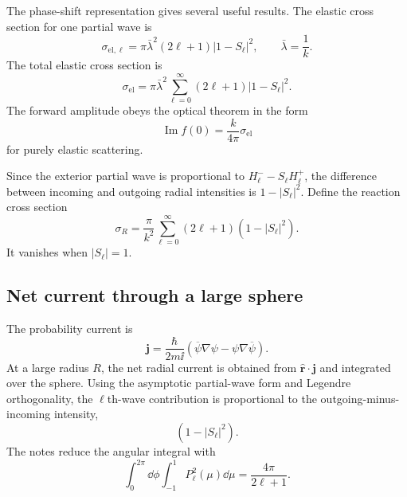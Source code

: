 The phase-shift representation gives several useful results.  The elastic cross section for one partial wave is
\begin{equation}
  \sigma_{\mathrm{el},\ell}
  =\pi\bar\lambda^2(2\ell+1)|1-S_\ell|^2,
  \qquad \bar\lambda=\frac{1}{k}.
  \label{eq:ns2-el-partial}
\end{equation}
The total elastic cross section is
\begin{equation}
  \sigma_{\mathrm{el}}
  =\pi\bar\lambda^2
  \sum_{\ell=0}^{\infty}(2\ell+1)|1-S_\ell|^2.
  \label{eq:ns2-el-total}
\end{equation}
The forward amplitude obeys the optical theorem in the form
\begin{equation}
  \operatorname{Im}f(0)=\frac{k}{4\pi}\sigma_{\mathrm{el}}
  \label{eq:ns2-optical-elastic}
\end{equation}
for purely elastic scattering.

Since the exterior partial wave is proportional to $H_\ell^- -S_\ell H_\ell^+$, the difference between incoming and outgoing radial intensities is $1-|S_\ell|^2$.  Define the reaction cross section
\begin{equation}
  \sigma_R=\frac{\pi}{k^2}
  \sum_{\ell=0}^{\infty}(2\ell+1)(1-|S_\ell|^2).
  \label{eq:ns2-reaction-xs}
\end{equation}
It vanishes when $|S_\ell|=1$.

\subsection*{Net current through a large sphere}
The probability current is
\[
  \bm j=\frac{\hbar}{2m\ii}
  (\overline\psi\nabla\psi-\psi\nabla\overline\psi).
\]
At a large radius $R$, the net radial current is obtained from $\widehat{\bm r}\cdot\bm j$ and integrated over the sphere.  Using the asymptotic partial-wave form and Legendre orthogonality, the $\ell$th-wave contribution is proportional to the outgoing-minus-incoming intensity,
\[
  \left(1-|S_\ell|^2\right).
\]
The notes reduce the angular integral with
\[
  \int_0^{2\pi}\dd\phi\int_{-1}^{1}P_\ell^2(\mu)\dd\mu
  =\frac{4\pi}{2\ell+1}.
\]

